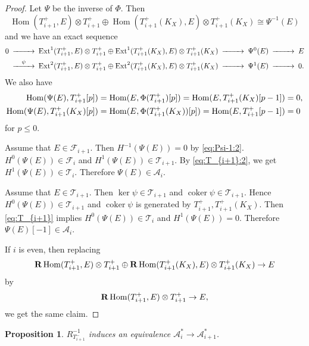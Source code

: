 \documentclass[leqno,11pt]{amsart}
\def\Ext{\mathop{\mathrm{Ext}}\nolimits}
\def\Hom{\mathop{\mathrm{Hom}}\nolimits}
\def\coker{\mathop{\mathrm{coker}}\nolimits}
\newtheorem{Prop}[Thm]{Proposition}
\theoremstyle{definition}
\def\AA{\ensuremath{\mathcal A}}
\def\FF{\ensuremath{\mathcal F}}
\def\TT{\ensuremath{\mathcal T}}
\begin{document}
\begin{proof}
Let $\Psi$ be the inverse of $\Phi$.
Then
\begin{equation}\label{eq:Psi-1:2}
\Hom(T_{i+1}^+,E) \otimes T_{i+1}^+ \oplus
\Hom(T_{i+1}^+(K_X),E) \otimes T_{i+1}^+(K_X) \cong \Psi^{-1}(E)
\end{equation}
and we have an exact sequence
\begin{equation}
\begin{CD}
0 @>>> \Ext^1(T_{i+1}^+,E) \otimes T_{i+1}^+ \oplus
\Ext^1(T_{i+1}^+(K_X),E) \otimes T_{i+1}^+(K_X) @>>> \Psi^0(E) @>>>E \\
 @>{\psi}>> \Ext^2(T_{i+1}^+,E) \otimes T_{i+1}^+ \oplus
\Ext^2(T_{i+1}^+(K_X),E) \otimes T_{i+1}^+(K_X) @>>> \Psi^1(E) @>>>0.
\end{CD}
\end{equation}
We also have
\begin{equation}\label{eq:T_{i+1}:2}
\begin{split}
\Hom(\Psi(E),T_{i+1}^+[p])& =\Hom(E,\Phi(T_{i+1}^+)[p])=
\Hom(E, T_{i+1}^+(K_X)[p-1])=0,\\
\Hom(\Psi(E),T_{i+1}^+(K_X)[p])& =\Hom(E,\Phi(T_{i+1}^+(K_X))[p])=
\Hom(E, T_{i+1}^+[p-1])=0
\end{split}
\end{equation}
for $p \leq 0$.



Assume that 
$E \in \FF_{i+1}$.
Then $H^{-1}(\Psi(E))=0$ by \eqref{eq:Psi-1:2}.
$H^0(\Psi(E)) \in \FF_{i}$ and $H^1(\Psi(E)) \in \TT_{i+1}$.
By \eqref{eq:T_{i+1}:2}, we get
$H^1(\Psi(E)) \in \TT_i$.
Therefore $\Psi(E) \in \AA_i$.

Assume that $E \in \TT_{i+1}$.
Then $\ker \psi \in \TT_{i+1}$ and
$\coker \psi \in \TT_{i+1}$.
Hence $H^0(\Psi(E)) \in \TT_{i+1}$ and
$\coker \psi$ is generated by $T_{i+1}^+,T_{i+1}^+(K_X)$.
Then \eqref{eq:T_{i+1}} implies 
$H^0(\Psi(E)) \in \TT_i$ and
$H^1(\Psi(E))=0$.
Therefore $\Psi(E)[-1] \in \AA_i$.

If $i$ is even, then
replacing 
$$
{\bf R}\Hom(T_{i+1}^+,E) \otimes T_{i+1}^+
\oplus {\bf R}\Hom(T_{i+1}^+ (K_X),E) \otimes T_{i+1}^+ (K_X)
\to E$$
 by
$$
{\bf R}\Hom(T_{i+1}^+,E) \otimes T_{i+1}^+
\to E,
$$ 
we get the same claim.
\end{proof}






\begin{Prop}\label{Prop:equiv2-2}
$R_{T_{i+1}^-}^{-1}$ induces an equivalence
$\AA_i^* \to \AA_{i+1}^*$.
\end{Prop}
\end{document}
